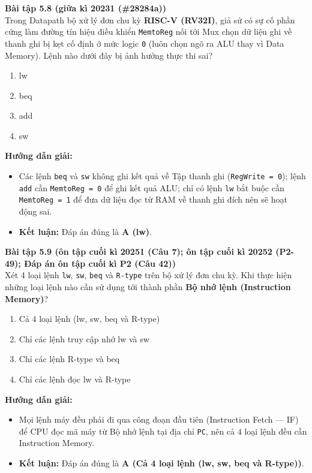 \textbf{Bài tập 5.8 (giữa kì 20231 (\#28284a))}\\
Trong Datapath bộ xử lý đơn chu kỳ \textbf{RISC-V (RV32I)}, giả sử có sự cố phần cứng làm đường tín hiệu điều khiển \texttt{MemtoReg} nối tới Mux chọn dữ liệu ghi về thanh ghi bị kẹt cố định ở mức logic \texttt{0} (luôn chọn ngõ ra ALU thay vì Data Memory). Lệnh nào dưới đây bị ảnh hưởng thực thi sai?
\begin{enumerate}[label=\Alph*.]
    \item lw
    \item beq
    \item add
    \item sw
\end{enumerate}
\textbf{Hướng dẫn giải:}
\begin{itemize}
    \item Các lệnh \texttt{beq} và \texttt{sw} không ghi kết quả về Tập thanh ghi (\texttt{RegWrite = 0}); lệnh \texttt{add} cần \texttt{MemtoReg = 0} để ghi kết quả ALU; chỉ có lệnh \texttt{lw} bắt buộc cần \texttt{MemtoReg = 1} để đưa dữ liệu đọc từ RAM về thanh ghi đích nên sẽ hoạt động sai.
    \item \textbf{Kết luận:} Đáp án đúng là \textbf{A (lw)}.
\end{itemize}

\textbf{Bài tập 5.9 (ôn tập cuối kì 20251 (Câu 7); ôn tập cuối kì 20252 (P2-49); Đáp án ôn tập cuối kì P2 (Câu 42))}\\
Xét 4 loại lệnh \texttt{lw}, \texttt{sw}, \texttt{beq} và \texttt{R-type} trên bộ xử lý đơn chu kỳ. Khi thực hiện những loại lệnh nào cần sử dụng tới thành phần \textbf{Bộ nhớ lệnh (Instruction Memory)}?
\begin{enumerate}[label=\Alph*.]
    \item Cả 4 loại lệnh (lw, sw, beq và R-type)
    \item Chỉ các lệnh truy cập nhớ lw và sw
    \item Chỉ các lệnh R-type và beq
    \item Chỉ các lệnh đọc lw và R-type
\end{enumerate}
\textbf{Hướng dẫn giải:}
\begin{itemize}
    \item Mọi lệnh máy đều phải đi qua công đoạn đầu tiên (Instruction Fetch --- IF) để CPU đọc mã máy từ Bộ nhớ lệnh tại địa chỉ \texttt{PC}, nên cả $4$ loại lệnh đều cần Instruction Memory.
    \item \textbf{Kết luận:} Đáp án đúng là \textbf{A (Cả 4 loại lệnh (lw, sw, beq và R-type))}.
\end{itemize}

